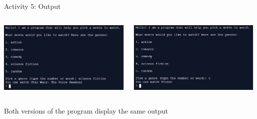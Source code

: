 \documentclass[hyperref={pdfpagemode=FullScreen},aspectratio=169]{beamer}
\begin{document}
  \begin{frame}{Activity 5: Output}

    \begin{columns}[c]
      \begin{column}{0.48\textwidth}
        \begin{center}
          \includegraphics[scale=0.48]{./imgs/activityFiveOutputPart1.jpg}
        \end{center}
      \end{column}

      \hfill

      \begin{column}{0.48\textwidth}
        \begin{center}
          \includegraphics[scale=0.48]{./imgs/activityFiveOutputPart2.jpg}
        \end{center}
      \end{column}
    \end{columns}

    \begin{center}
      Both versions of the program display the same output
    \end{center}
    
  \end{frame}
\end{document}
